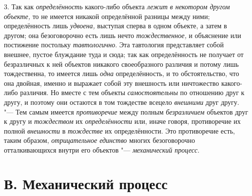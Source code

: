 3. Так как {\em определённость} какого-либо объекта {\em лежит}
{\em в некотором другом объекте,}
то не имеется никакой определённой разницы между ними;
определённость лишь {\em удвоена,}
выступая сперва в одном объекте, а затем в другом; она
безоговорочно есть лишь нечто {\em тождественное,} и
объяснение или постижение постольку {\em тавтологично}. Эта
тавтология представляет собой внешнее, пустое блуждание туда и сюда; так
как определённость не получает от безразличных к ней объектов никакого
своеобразного различия и потому лишь тождественна, то имеется лишь {\em одна}
определённость, и то обстоятельство, что она двойная, именно
и выражает собой эту внешность или ничтожество какого-либо различия. Но
вместе с тем объекты {\em самостоятельны} по
отношению друг к другу, и поэтому они остаются в том тождестве всецело
{\em внешними} друг другу. "--- Тем самым имеется {\em противоречие} между
полным {\em безразличием} объектов друг к другу и {\em тождеством} их
{\em определённости} или, иначе говоря, противоречие их полной
{\em внешности} в {\em тождестве} их определённости. Это противоречие есть,
таким образом, {\em отрицательное единство} многих безоговорочно
отталкивающихся внутри его объектов "--- {\em механический процесс}.

\section[В. Механический процесс]{В. Механический процесс}

